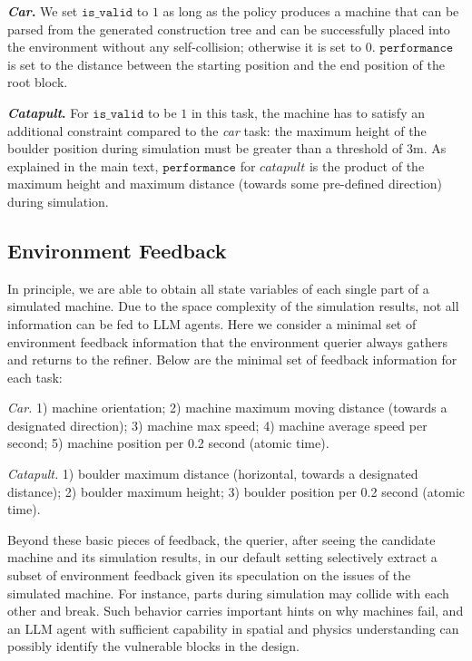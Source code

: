 \textbf{\textit{Car}.} We set $\texttt{is\_valid}$ to $1$ as long as the policy produces a machine that can be parsed from the generated construction tree and can be successfully placed into the environment without any self-collision; otherwise it is set to 0. $\texttt{performance}$ is set to the distance between the starting position and the end position of the root block. 


\textbf{\textit{Catapult}.} For $\texttt{is\_valid}$ to be $1$ in this task, the machine has to satisfy an additional constraint compared to the \textit{car} task: the maximum height of the boulder position during simulation must be greater than a threshold of 3m. As explained in the main text, $\texttt{performance}$ for $\textit{catapult}$ is the product of the maximum height and maximum distance (towards some pre-defined direction) during simulation.


\subsection{Environment Feedback}\label{sec:env_feedback}

In principle, we are able to obtain all state variables of each single part of a simulated machine. Due to the space complexity of the simulation results, not all information can be fed to LLM agents. Here we consider a minimal set of environment feedback information that the environment querier always gathers and returns to the refiner. Below are the minimal set of feedback information for each task:


\textit{Car.} 1) machine orientation; 2) machine maximum moving distance (towards a designated direction); 3) machine max speed; 4) machine average speed per second; 5) machine position per 0.2 second (atomic time).

\textit{Catapult.} 1) boulder maximum distance (horizontal, towards a designated distance); 2) boulder maximum height; 3) boulder position per 0.2 second (atomic time).

Beyond these basic pieces of feedback, the querier, after seeing the candidate machine and its simulation results, in our default setting selectively extract a subset of environment feedback given its speculation on the issues of the simulated machine. For instance, parts during simulation may collide with each other and break. Such behavior carries important hints on why machines fail, and an LLM agent with sufficient capability in spatial and physics understanding can possibly identify the vulnerable blocks in the design.

